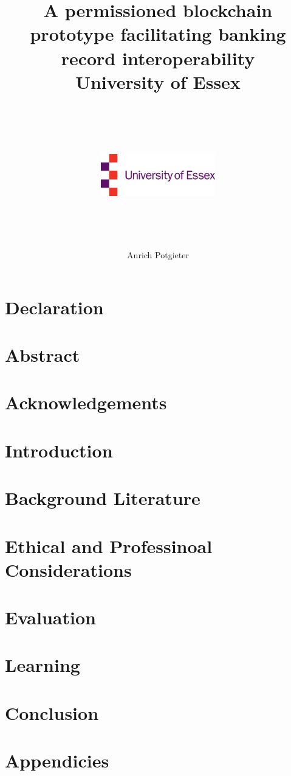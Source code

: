 \documentclass[12pt]{report}
\title{
    {A permissioned blockchain prototype facilitating banking record interoperability}\\
    {\large University of Essex}\\~\\
    {\includegraphics[width=5cm,height=5cm,keepaspectratio]{university.jpg}}
    }
\author{Anrich Potgieter}
\begin{document}
    
    \maketitle
    
    \chapter*{Declaration}

    \chapter*{Abstract}

    \chapter*{Acknowledgements}

    \tableofcontents

    \chapter{Introduction}

    \chapter{Background Literature}

    \chapter{Ethical and Professinoal Considerations}

    \chapter{Evaluation}

    \chapter{Learning}

    \chapter{Conclusion}

    \printbibliography

    \appendix
    \chapter{Appendicies}
\end{document}
